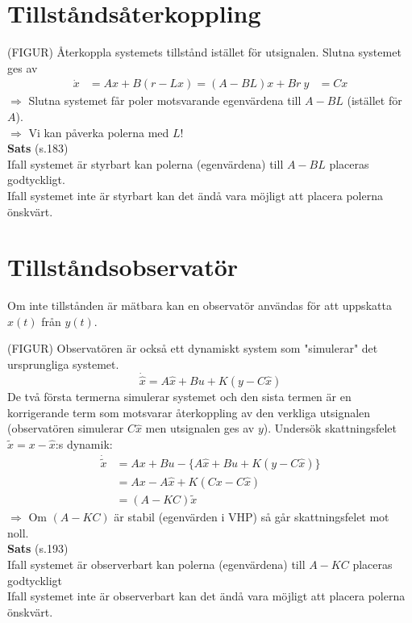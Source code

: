 \documentclass[12pt]{article}
\begin{document}
\section*{Tillståndsåterkoppling}
(FIGUR)
Återkoppla systemets tillstånd istället för utsignalen. Slutna systemet ges av
\begin{align*}
\dot{x} &= Ax + B(r-Lx) = (A-BL)x + Br \
y &= Cx
\end{align*}
$\Rightarrow$ Slutna systemet får poler motsvarande egenvärdena till $A-BL$ (istället för $A$). \\
$\Rightarrow$ Vi kan påverka polerna med $L$!\\

\textbf{Sats} (s.183) \\
Ifall systemet är styrbart kan polerna (egenvärdena) till $A-BL$ placeras godtyckligt.\\

Ifall systemet inte är styrbart kan det ändå vara möjligt att placera polerna önskvärt.

\section*{Tillståndsobservatör}
Om inte tillstånden är mätbara kan en observatör användas för att uppskatta $x(t)$ från $y(t)$.

(FIGUR)
Observatören är också ett dynamiskt system som "simulerar" det ursprungliga systemet.
\[\dot{\hat{x}} = A\hat{x} + Bu + K(y-C\hat{x})\]
De två första termerna simulerar systemet och den sista termen är en korrigerande term som motsvarar återkoppling av den verkliga utsignalen (observatören simulerar $C\hat{x}$ men utsignalen ges av $y$). Undersök skattningsfelet $\tilde{x} = x - \hat{x}$:s dynamik:
\begin{align*}
\dot{\tilde{x}} &= Ax + Bu - \lbrace A\hat{x} + Bu + K(y-C\hat{x}) \rbrace \\
&= Ax - A\hat{x} + K(Cx - C\hat{x}) \\
&= (A-KC)\tilde{x}
\end{align*}
$\Rightarrow$ Om $(A-KC)$ är stabil (egenvärden i VHP) så går skattningsfelet mot noll. \\

\textbf{Sats} (s.193) \\
Ifall systemet är observerbart kan polerna (egenvärdena) till $A-KC$ placeras godtyckligt\\

Ifall systemet inte är observerbart kan det ändå vara möjligt att placera polerna önskvärt.
\end{document}
